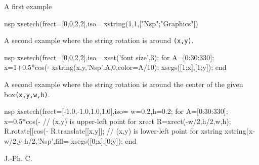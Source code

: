 \begin{examples}

\noindent A first example

  \begin{mintednsp}{nsp}
    xsetech(frect=[0,0,2,2],iso=%
    xstring(1,1,["Nsp";"Graphics"])
  \end{mintednsp}

\noindent A second example where the string rotation is around \verb!(x,y)!.

  \begin{mintednsp}{nsp}
    xsetech(frect=[0,0,2,2],iso=%
    xset('font size',3);
    for A=[0:30:330];
      x=1+0.5*cos(-%
      xstring(x,y,'Nsp',A,0,color=A/10);
      xsegs([1;x],[1;y]);
    end
  \end{mintednsp}

\noindent A second example where the string rotation is around the center of the
  given box\verb!(x,y,w,h)!.

  \begin{mintednsp}{nsp}
    xsetech(frect=[-1.0,-1.0,1.0,1.0],iso=%
    w=0.2,h=0.2;
    for A=[0:30:330];
       x=0.5*cos(-%
       // (x,y) is upper-left point for xrect
       R=xrect(-w/2,h/2,w,h);
       R.rotate[[cos(-%
       R.translate[[x,y]];
       // (x,y) is lower-left point for xstring
       xstring(x-w/2,y-h/2,'Nsp',fill=%
       xsegs([0;x],[0;y]);
    end
  \end{mintednsp}

\end{examples}

\begin{manseealso}
     
\end{manseealso}


\begin{authors}
  J.-Ph. C.
\end{authors}
